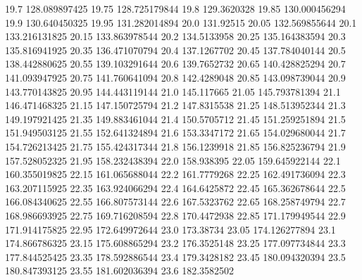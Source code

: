            19.7    128.089897425
          19.75    128.725179844
           19.8      129.3620328
          19.85    130.000456294
           19.9    130.640450325
          19.95    131.282014894
           20.0        131.92515
          20.05    132.569855644
           20.1    133.216131825
          20.15    133.863978544
           20.2      134.5133958
          20.25    135.164383594
           20.3    135.816941925
          20.35    136.471070794
           20.4      137.1267702
          20.45    137.784040144
           20.5    138.442880625
          20.55    139.103291644
           20.6      139.7652732
          20.65    140.428825294
           20.7    141.093947925
          20.75    141.760641094
           20.8      142.4289048
          20.85    143.098739044
           20.9    143.770143825
          20.95    144.443119144
           21.0       145.117665
          21.05    145.793781394
           21.1    146.471468325
          21.15    147.150725794
           21.2      147.8315538
          21.25    148.513952344
           21.3    149.197921425
          21.35    149.883461044
           21.4      150.5705712
          21.45    151.259251894
           21.5    151.949503125
          21.55    152.641324894
           21.6      153.3347172
          21.65    154.029680044
           21.7    154.726213425
          21.75    155.424317344
           21.8      156.1239918
          21.85    156.825236794
           21.9    157.528052325
          21.95    158.232438394
           22.0       158.938395
          22.05    159.645922144
           22.1    160.355019825
          22.15    161.065688044
           22.2      161.7779268
          22.25    162.491736094
           22.3    163.207115925
          22.35    163.924066294
           22.4      164.6425872
          22.45    165.362678644
           22.5    166.084340625
          22.55    166.807573144
           22.6      167.5323762
          22.65    168.258749794
           22.7    168.986693925
          22.75    169.716208594
           22.8      170.4472938
          22.85    171.179949544
           22.9    171.914175825
          22.95    172.649972644
           23.0        173.38734
          23.05    174.126277894
           23.1    174.866786325
          23.15    175.608865294
           23.2      176.3525148
          23.25    177.097734844
           23.3    177.844525425
          23.35    178.592886544
           23.4      179.3428182
          23.45    180.094320394
           23.5    180.847393125
          23.55    181.602036394
           23.6      182.3582502
